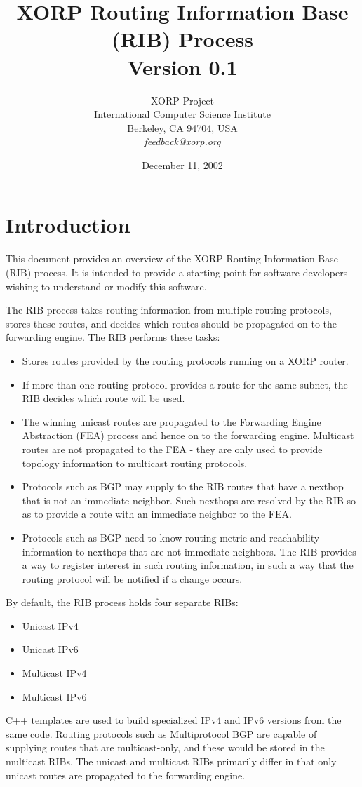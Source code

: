 \documentclass[11pt]{article}
\title{XORP Routing Information Base (RIB) Process \\
\vspace{1ex}
Version 0.1}
\author{ XORP Project					\\
	 International Computer Science Institute	\\
	 Berkeley, CA 94704, USA			\\
	 {\it feedback@xorp.org}
}
\date{December 11, 2002}
\begin{document}
\maketitle                            
\section{Introduction}
This document provides an overview of the XORP Routing Information
Base (RIB) process.  It is intended to provide a starting point for
software developers wishing to understand or modify this software.

The RIB process takes routing information from multiple routing
protocols, stores these routes, and decides which routes should be
propagated on to the forwarding engine.  The RIB performs these tasks:
\begin{itemize}
\item Stores routes provided by the routing protocols running on a
XORP router.
\item If more than one routing protocol provides a route for the same
subnet, the RIB decides which route will be used.
\item The winning unicast routes are propagated to the Forwarding
Engine Abstraction (FEA) process and hence on to the forwarding
engine.  Multicast routes are not propagated to the FEA - they are
only used to provide topology information to multicast routing
protocols.
\item Protocols such as BGP may supply to the RIB routes that have a
nexthop that is not an immediate neighbor.  Such nexthops are resolved
by the RIB so as to provide a route with an immediate neighbor to the
FEA.
\item Protocols such as BGP need to know routing metric and
reachability information to nexthops that are not immediate
neighbors.  The RIB provides a way to register interest in such
routing information, in such a way that the routing protocol will be
notified if a change occurs.
\end{itemize}
By default, the RIB process holds four separate RIBs:
\begin{itemize}
\item Unicast IPv4
\item Unicast IPv6
\item Multicast IPv4
\item Multicast IPv6
\end{itemize}
C++ templates are used to build specialized IPv4 and IPv6 versions
from the same code.  Routing protocols such as Multiprotocol BGP are
capable of supplying routes that are multicast-only, and these would
be stored in the multicast RIBs.  The unicast and multicast RIBs
primarily differ in that only unicast routes are propagated to the
forwarding engine.
\end{document}

